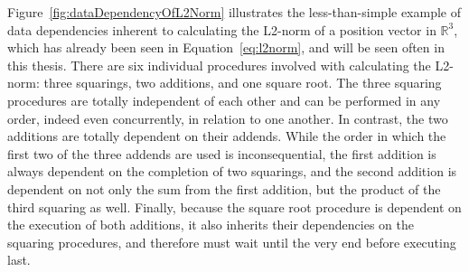 {{Figure~\ref{fig:dataDependencyOfL2Norm} illustrates the less-than-simple example of data dependencies inherent to calculating the L2-norm of a position vector in $\mathbb{R}^{3}$, which has already been seen in Equation~\ref{eq:l2norm}, and will be seen often in this thesis. There are six individual procedures involved with calculating the L2-norm: three squarings, two additions, and one square root. The three squaring procedures are totally independent of each other and can be performed in any order, indeed even concurrently, in relation to one another. In contrast, the two additions are totally dependent on their addends. While the order in which the first two of the three addends are used is inconsequential, the first addition is always dependent on the completion of two squarings, and the second addition is dependent on not only the sum from the first addition, but the product of the third squaring as well. Finally, because the square root procedure is dependent on the execution of both additions, it also inherits their dependencies on the squaring procedures, and therefore must wait until the very end before executing last.

\begin{figure}[ht]
\end{figure}}}
